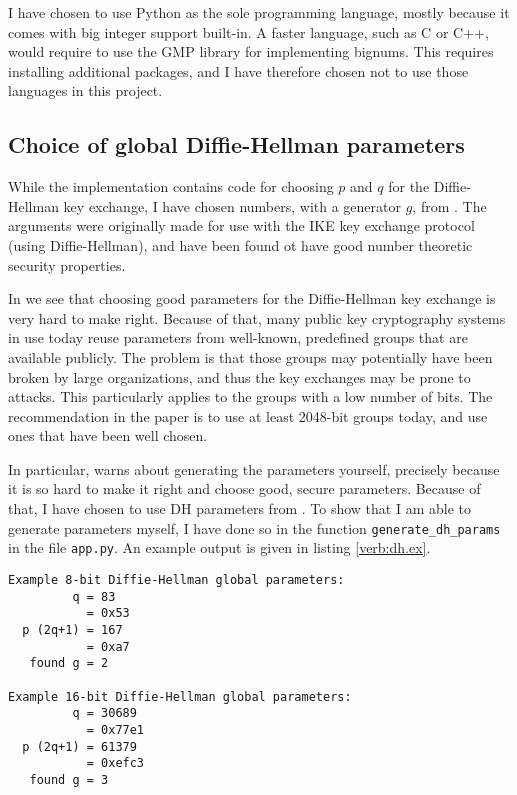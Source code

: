 \documentclass[a4paper,english,12pt]{article}
\begin{document}
I have chosen to use Python as the sole programming language, mostly because it
comes with big integer support built-in. A faster language, such as C or C++,
would require to use the GMP library \cite{wiki:gmp} for implementing bignums.
This requires installing additional packages, and I have therefore chosen not
to use those languages in this project.

\subsection{Choice of global Diffie-Hellman parameters}
While the implementation contains code for choosing $p$ and $q$ for the
Diffie-Hellman key exchange, I have chosen numbers, with a generator $g$, from
\cite{rfc3526}. The arguments were originally made for use with the IKE key
exchange protocol (using Diffie-Hellman), and have been found ot have good
number theoretic security properties.

In \cite{dh.params} we see that choosing good parameters for the Diffie-Hellman
key exchange is very hard to make right. Because of that, many public key
cryptography systems in use today reuse parameters from well-known, predefined
groups that are available publicly. The problem is that those groups may
potentially have been broken by large organizations, and thus the key exchanges
may be prone to attacks. This particularly applies to the groups with a low
number of bits. The recommendation in the paper is to use at least 2048-bit
groups today, and use ones that have been well chosen. 

In particular, \cite{dh.params} warns about generating the parameters yourself,
precisely because it is so hard to make it right and choose good, secure
parameters. Because of that, I have chosen to use DH parameters from
\cite{rfc3526}. To show that I am able to generate parameters myself, I have
done so in the function \texttt{generate\_dh\_params} in the file
\texttt{app.py}. An example output is given in listing \vref{verb:dh.ex}.

\begin{lstlisting}[caption={Example Diffie-Hellman parameters}, label=verb:dh.ex]
Example 8-bit Diffie-Hellman global parameters:
         q = 83
           = 0x53
  p (2q+1) = 167
           = 0xa7
   found g = 2

Example 16-bit Diffie-Hellman global parameters:
         q = 30689
           = 0x77e1
  p (2q+1) = 61379
           = 0xefc3
   found g = 3
\end{lstlisting}
\end{document}
